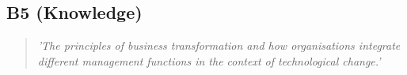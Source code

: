 \subsection*{B5 (Knowledge)}

  \begin{quote}
    \textit{'The principles of business
    transformation and how organisations integrate different
    management functions in the context of technological
    change.'}
  \end{quote}

\newpage